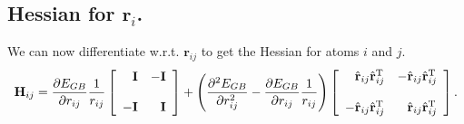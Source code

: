 \documentclass[12pt]{article}
\begin{document}
\subsection*{Hessian for $\mathbf{r}_i$.}

We can now differentiate w.r.t. $\mathbf{r}_{ij}$ to get the Hessian for atoms $i$ and $j$.
\begin{equation}
\mathbf{H}_{ij}=
\frac{\partial E_{GB}}{\partial r_{ij}}\frac{1}{r_{ij}}
\left[
\begin{array}{r r}
\mathbf{I} & -\mathbf{I}\\
\\
-\mathbf{I} & \mathbf{I}
\end{array}\right]
+
\left(
\frac{\partial^2 E_{GB}}{\partial r_{ij}^2}-\frac{\partial E_{GB}}{\partial r_{ij}}\frac{1}{r_{ij}}
\right)
\left[
\begin{array}{r r}
\hat{\mathbf{r}}_{ij}\hat{\mathbf{r}}_{ij}^{\mathrm{T}} & -\hat{\mathbf{r}}_{ij}\hat{\mathbf{r}}_{ij}^{\mathrm{T}}\\
\\
-\hat{\mathbf{r}}_{ij}\hat{\mathbf{r}}_{ij}^{\mathrm{T}} & \hat{\mathbf{r}}_{ij}\hat{\mathbf{r}}_{ij}^{\mathrm{T}}
\end{array}\right].
\end{equation}
\end{document}
